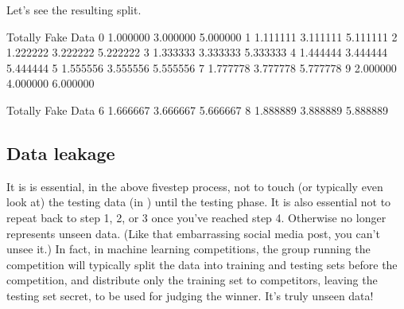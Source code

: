 \documentclass[letterpaper,10pt,english]{sphinxmanual}
\begin{document}
\begin{sphinxVerbatim}[commandchars=\\\{\}]
      
    
  \PYG{p}{[}\PYG{p}{]}
  \PYG{p}{[}\PYG{p}{]}
\end{sphinxVerbatim}

Let’s see the resulting split.

\begin{sphinxVerbatim}[commandchars=\\\{\}]
\end{sphinxVerbatim}

\begin{sphinxVerbatim}[commandchars=\\\{\}]
    Totally      Fake      Data
0  1.000000  3.000000  5.000000
1  1.111111  3.111111  5.111111
2  1.222222  3.222222  5.222222
3  1.333333  3.333333  5.333333
4  1.444444  3.444444  5.444444
5  1.555556  3.555556  5.555556
7  1.777778  3.777778  5.777778
9  2.000000  4.000000  6.000000
\end{sphinxVerbatim}

\begin{sphinxVerbatim}[commandchars=\\\{\}]
\end{sphinxVerbatim}

\begin{sphinxVerbatim}[commandchars=\\\{\}]
    Totally      Fake      Data
6  1.666667  3.666667  5.666667
8  1.888889  3.888889  5.888889
\end{sphinxVerbatim}


\subsection{Data leakage}
\label{\detokenize{chapter-17-machine-learning:data-leakage}}
It is is essential, in the above five\sphinxhyphen{}step process, not to touch (or typically even look at) the testing data (in ) until the testing phase.  It is also essential not to repeat back to step 1, 2, or 3 once you’ve reached step 4.  Otherwise  no longer represents unseen data.  (Like that embarrassing social media post, you can’t unsee it.)  In fact, in machine learning competitions, the group running the competition will typically split the data into training and testing sets before the competition, and distribute only the training set to competitors, leaving the testing set secret, to be used for judging the winner.  It’s truly unseen data!
\end{document}
